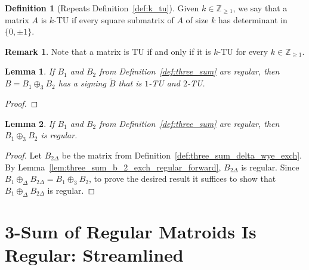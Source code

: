 \documentclass{article}
\newtheorem{lemma}{Lemma}
\theoremstyle{definition}
\newtheorem{definition}{Definition}
\newtheorem{remark}{Remark}
\begin{document}
\begin{definition}[Repeats Definition~\ref{def:k_tu}]\label{def:three_sum_k_tu}
    Given $k \in \mathbb{Z}_{\geq 1}$, we say that a matrix $A$ is $k$-TU if every square submatrix of $A$ of size $k$ has determinant in $\{0, \pm 1\}$.
\end{definition}

\begin{remark}
    Note that a matrix is TU if and only if it is $k$-TU for every $k \in \mathbb{Z}_{\geq 1}$.
\end{remark}

\begin{lemma}\label{lem:three_sum_reg_det_12}
    If $B_{1}$ and $B_{2}$ from Definition~\ref{def:three_sum} are regular, then $B = B_{1} \oplus_{3} B_{2}$ has a signing $\tilde{B}$ that is $1$-TU and $2$-TU.
\end{lemma}

\begin{proof}
\end{proof}


\begin{lemma}\label{lem:three_sum_regularity}
    If $B_{1}$ and $B_{2}$ from Definition~\ref{def:three_sum} are regular, then $B_{1} \oplus_{3} B_{2}$ is regular.
\end{lemma}

\begin{proof}
    Let $B_{2 \Delta}$ be the matrix from Definition~\ref{def:three_sum_delta_wye_exch}. By Lemma~\ref{lem:three_sum_b_2_exch_regular_forward}, $B_{2 \Delta}$ is regular. Since $B_{1} \oplus_{\Delta} B_{2 \Delta} = B_{1} \oplus_{3} B_{2}$, to prove the desired result it suffices to show that $B_{1} \oplus_{\Delta} B_{2 \Delta}$ is regular.

\end{proof}


\newpage
\section{3-Sum of Regular Matroids Is Regular: Streamlined}
\end{document}
